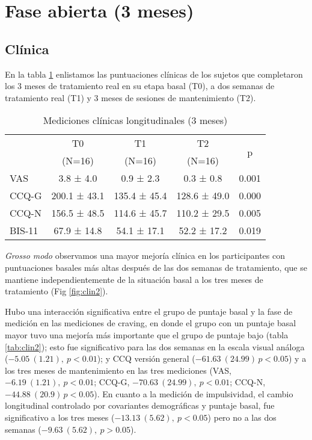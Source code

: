 \section{Fase abierta (3 meses)}
\subsection{Clínica}
En la tabla \ref{tab:cl2} enlistamos las puntuaciones clínicas de los sujetos que completaron los 3 meses de tratamiento real en su etapa basal (T0), a dos semanas de tratamiento real (T1) y 3 meses de sesiones de mantenimiento (T2).

\begin{table}[!htb]
    \centering
    \small
    \caption{Mediciones clínicas longitudinales (3 meses)}
    \label{tab:cl2}
\begin{tabular}{lcccc}
\hline
 & T0 & T1 & T2 & \multirow{2}{*}{p}\\
 & (N=16) & (N=16) & (N=16) &  \\
\hline
VAS   &  3.8 ±  4.0 &  0.9 ±  2.3 &  0.3 ±  0.8 & 0.001\\
CCQ-G  & 200.1 ± 43.1 & 135.4 ± 45.4 & 128.6 ± 49.0 & 0.000\\
CCQ-N  & 156.5 ± 48.5 & 114.6 ± 45.7 & 110.2 ± 29.5 & 0.005\\
BIS-11 & 67.9 ± 14.8 & 54.1 ± 17.1 & 52.2 ± 17.2 & 0.019\\
\hline
\end{tabular}
\end{table}

\textit{Grosso modo} observamos una mayor mejoría clínica en los participantes con puntuaciones basales más altas después de las dos semanas de tratamiento, que se mantiene independientemente de la situación basal a los tres meses de tratamiento (Fig \ref{fig:clin2}).\par
Hubo una interacción significativa entre el grupo de puntaje basal y la fase de medición en las mediciones de craving, en donde el grupo con un puntaje basal mayor tuvo una mejoría más importante que el grupo de puntaje bajo (tabla \ref{tab:clin2}); esto fue significativo para las dos semanas en la escala visual análoga ($-5.05\ (1.21),\ p<0.01$); y CCQ versión general ($-61.63\ (24.99)\, p<0.05$) y a los tres meses de mantenimiento en las tres mediciones (VAS, $-6.19\ (1.21),\ p<0.01$; CCQ-G, $-70.63\ (24.99),\ p<0.01$; CCQ-N, $-44.88\ (20.9)\, p<0.05$). En cuanto a la medición de impulsividad, el cambio longitudinal controlado por covariantes demográficas y puntaje basal, fue significativo a los tres meses ($-13.13\ (5.62),\ p<0.05$) pero no a las dos semanas ($-9.63\ (5.62),\ p>0.05$).

